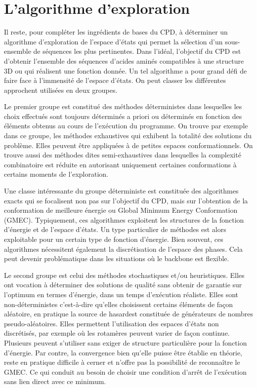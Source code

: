\section{L'algorithme d'exploration}

Il reste, pour compléter les ingrédients de bases du CPD, à déterminer un algorithme d'exploration de l'espace d'états qui permet la sélection d'un sous-ensemble de séquences les plus pertinentes. Dans l'idéal, l'objectif du CPD est d'obtenir l'ensemble des séquences d'acides aminés compatibles à une structure 3D ou qui réalisent une fonction donnée. Un tel algorithme a pour grand défi de faire face à l'immensité de l'espace d'états. On peut classer les différentes approchent utilisées en deux groupes.

Le premier groupe est constitué des méthodes déterministes dans lesquelles les choix effectués sont toujours déterminés a priori ou déterminés en fonction des éléments obtenus au cours de l'exécution du programme. On trouve par exemple dans ce groupe, les méthodes exhaustives qui exhibent la totalité des solutions du problème. Elles peuvent être appliquées à de petites espaces conformationnels. On trouve aussi des méthodes dites semi-exhaustives dans lesquelles la complexité combinatoire est réduite en autorisant uniquement certaines conformations à certains moments de l'exploration.

Une classe intéressante du groupe déterministe est constituée des algorithmes exacts qui se focalisent non pas sur l'objectif du CPD, mais sur l'obtention de la conformation de meilleure énergie ou \og Global Minimum Energy Conformation \fg (GMEC). Typiquement, ces algorithmes exploitent les structures de la fonction d'énergie et de l'espace d'états. Un type particulier de méthodes est alors exploitable pour un certain type de fonction d'énergie. Bien souvent, ces algorithmes nécessitent également la discrétisation de l'espace des phases. Cela peut devenir problématique dans les situations où le backbone est flexible.
  
Le second groupe est celui des méthodes stochastiques et/ou heuristiques. Elles ont vocation à déterminer des solutions de qualité sans obtenir de garantie sur l'optimum en termes d'énergie, dans un temps d'exécution réaliste. Elles sont non-déterministes c'est-à-dire qu'elles choisissent certains éléments de façon aléatoire, en pratique la \og source de hasard\fg est constituée de générateurs de nombres pseudo-aléatoires. Elles permettent l'utilisation des espaces d'états non discrétisés, par exemple \cite{Perry12} où les rotamères peuvent varier de façon continue. Plusieurs peuvent s'utiliser sans exiger de structure particulière pour la fonction d'énergie. Par contre, la convergence bien qu'elle puisse être établie en théorie, reste en pratique difficile à cerner et n'offre pas la possibilité de reconnaître le GMEC. Ce qui conduit au besoin de choisir une condition d'arrêt de l'exécution sans lien direct avec ce minimum.  

